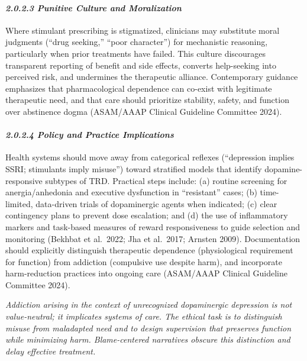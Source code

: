 \paragraph{\texorpdfstring{\emph{2.0.2.3 Punitive Culture and Moralization}}{2.0.2.3 Punitive Culture and Moralization}}\label{10b_traad-punitive-culture-and-moralization}

Where stimulant prescribing is stigmatized, clinicians may substitute moral judgments (``drug seeking,'' ``poor character'') for mechanistic reasoning, particularly when prior treatments have failed. This culture discourages transparent reporting of benefit and side effects, converts help-seeking into perceived risk, and undermines the therapeutic alliance. Contemporary guidance emphasizes that pharmacological dependence can co-exist with legitimate therapeutic need, and that care should prioritize stability, safety, and function over abstinence dogma (ASAM/AAAP Clinical Guideline Committee 2024).

\paragraph{\texorpdfstring{\emph{2.0.2.4 Policy and Practice Implications}}{2.0.2.4 Policy and Practice Implications}}\label{10b_traad-policy-and-practice-implications}

Health systems should move away from categorical reflexes (``depression implies SSRI; stimulants imply misuse'') toward stratified models that identify dopamine-responsive subtypes of TRD. Practical steps include: (a) routine screening for anergia/anhedonia and executive dysfunction in ``resistant'' cases; (b) time-limited, data-driven trials of dopaminergic agents when indicated; (c) clear contingency plans to prevent dose escalation; and (d) the use of inflammatory markers and task-based measures of reward responsiveness to guide selection and monitoring (Bekhbat et al.~2022; Jha et al.~2017; Arnsten 2009). Documentation should explicitly distinguish therapeutic dependence (physiological requirement for function) from addiction (compulsive use despite harm), and incorporate harm-reduction practices into ongoing care (ASAM/AAAP Clinical Guideline Committee 2024).

\emph{Addiction arising in the context of unrecognized dopaminergic depression is not value-neutral; it implicates systems of care. The ethical task is to distinguish misuse from maladapted need and to design supervision that preserves function while minimizing harm. Blame-centered narratives obscure this distinction and delay effective treatment.}

